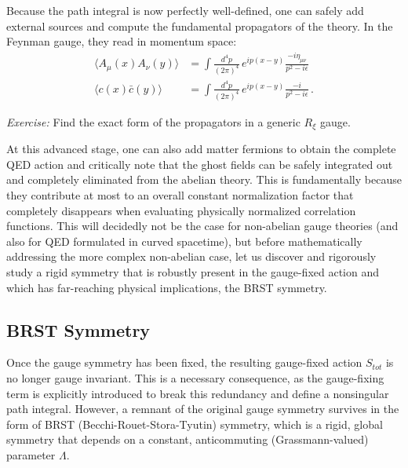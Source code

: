 \begin{example}
    Because the path integral is now perfectly well-defined, one can safely add external sources and compute the fundamental propagators of the theory. In the Feynman gauge, they read in momentum space:
    \begin{equation} \label{eq:propagators_feynman}
        \begin{aligned}
            \langle A_\mu(x) A_\nu(y) \rangle & = \int \frac{d^4p}{(2\pi)^4} \, e^{ip(x-y)} \frac{-i\eta_{\mu\nu}}{p^2 - i\epsilon} \\
            \langle c(x) \bar{c}(y) \rangle   & = \int \frac{d^4p}{(2\pi)^4} \, e^{ip(x-y)} \frac{-i}{p^2 - i\epsilon} \, .
        \end{aligned}
    \end{equation}
\end{example}

\textit{Exercise:} Find the exact form of the propagators in a generic \(R_\xi\) gauge.

At this advanced stage, one can also add matter fermions to obtain the complete QED action and critically note that the ghost fields can be safely integrated out and completely eliminated from the abelian theory. This is fundamentally because they contribute at most to an overall constant normalization factor that completely disappears when evaluating physically normalized correlation functions. This will decidedly not be the case for non-abelian gauge theories (and also for QED formulated in curved spacetime), but before mathematically addressing the more complex non-abelian case, let us discover and rigorously study a rigid symmetry that is robustly present in the gauge-fixed action and which has far-reaching physical implications, the BRST symmetry.

\subsection{BRST Symmetry}

Once the gauge symmetry has been fixed, the resulting gauge-fixed action \(S_{tot}\) is no longer gauge invariant. This is a necessary consequence, as the gauge-fixing term is explicitly introduced to break this redundancy and define a nonsingular path integral. However, a remnant of the original gauge symmetry survives in the form of BRST (Becchi-Rouet-Stora-Tyutin) symmetry, which is a rigid, global symmetry that depends on a constant, anticommuting (Grassmann-valued) parameter \(\Lambda\).


